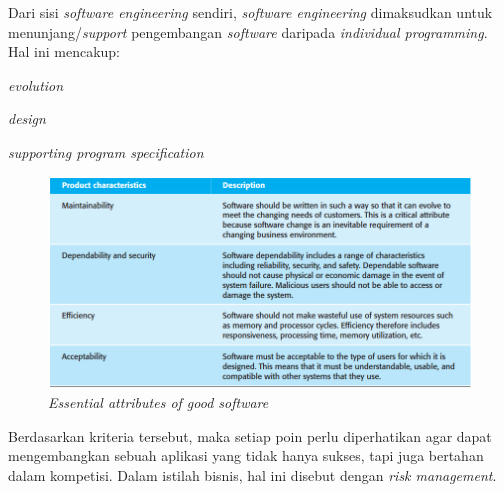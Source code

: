 	\indent Dari sisi \textit{software engineering} sendiri, \textit{software engineering} dimaksudkan untuk menunjang/\textit{support} pengembangan \textit{software} daripada \textit{individual programming}. Hal ini mencakup: \begin{inlinelist}
		\item \textit{evolution}
		\item \textit{design}
		\item \textit{supporting program specification}
	\end{inlinelist} \cite[p.~5]{software-engineering}
	
	\begin{figure}[H]
		\centering
		\includegraphics[width=.8\textwidth]{images/bab3/buku/essential-good-software.png}
		\caption{\textit{Essential attributes of good software}}
		\label{essential-software}
	\end{figure}
	
	\indent Berdasarkan kriteria tersebut, maka setiap poin perlu diperhatikan agar dapat mengembangkan sebuah aplikasi yang tidak hanya sukses, tapi juga bertahan dalam kompetisi. Dalam istilah bisnis, hal ini disebut dengan \textit{risk management}.
	
	
	
	
